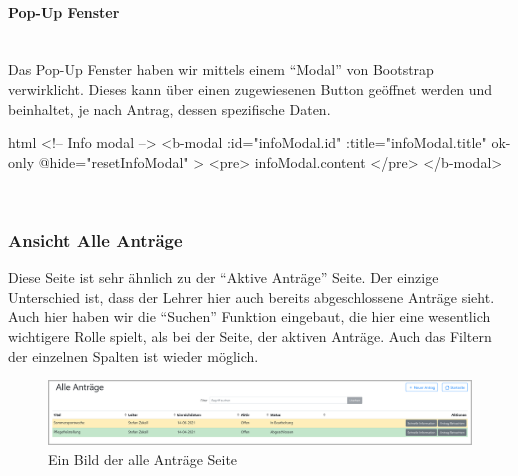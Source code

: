 \paragraph{Pop-Up Fenster}
~\\
Das Pop-Up Fenster haben wir mittels einem \enquote{Modal} von Bootstrap verwirklicht. Dieses kann über einen zugewiesenen Button geöffnet werden und beinhaltet, je nach Antrag, dessen spezifische Daten.
\begin{code}{html}
	<!-- Info modal -->
    <b-modal
      :id="infoModal.id"
      :title="infoModal.title"
      ok-only
      @hide="resetInfoModal"
    >
      <pre>{{ infoModal.content }}</pre>
    </b-modal>
\end{code}
	\label{list:codepopup} ~\\

\subsubsection{Ansicht Alle Anträge}
Diese Seite ist sehr ähnlich zu der \enquote{Aktive Anträge} Seite. Der einzige Unterschied ist, dass der Lehrer hier auch bereits abgeschlossene Anträge sieht. Auch hier haben wir die \enquote{Suchen} Funktion eingebaut, die hier eine wesentlich wichtigere Rolle spielt, als bei der Seite, der aktiven Anträge. Auch das Filtern der einzelnen Spalten ist wieder möglich.
\begin{figure}[H]
	\centering
	\includegraphics[width=1\linewidth]{images/website/alle}
	\caption[Aktiv]{Ein Bild der alle Anträge Seite}
	\label{fig:antragalle}
\end{figure}
~\\

\newpage

